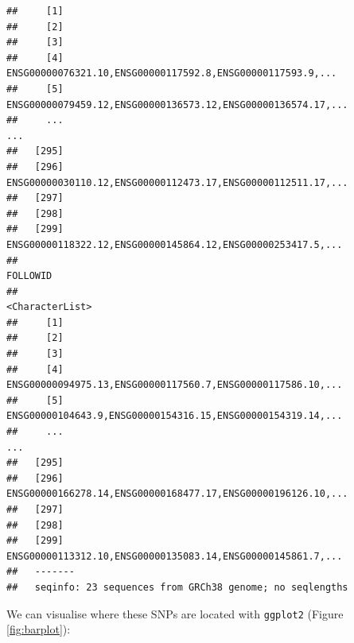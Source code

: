 \documentclass[9pt,a4paper,]{extarticle}
\newenvironment{Shaded}{\begin{snugshade}}{\end{snugshade}}
\newcommand{\KeywordTok}[1]{\textcolor[rgb]{0.13,0.29,0.53}{\textbf{#1}}}
\newcommand{\DataTypeTok}[1]{\textcolor[rgb]{0.13,0.29,0.53}{#1}}
\newcommand{\StringTok}[1]{\textcolor[rgb]{0.31,0.60,0.02}{#1}}
\newcommand{\OperatorTok}[1]{\textcolor[rgb]{0.81,0.36,0.00}{\textbf{#1}}}
\newcommand{\NormalTok}[1]{#1}
\begin{document}
\begin{verbatim}
##     [1]                                                             
##     [2]                                                             
##     [3]                                                             
##     [4]   ENSG00000076321.10,ENSG00000117592.8,ENSG00000117593.9,...
##     [5] ENSG00000079459.12,ENSG00000136573.12,ENSG00000136574.17,...
##     ...                                                          ...
##   [295]                                                             
##   [296] ENSG00000030110.12,ENSG00000112473.17,ENSG00000112511.17,...
##   [297]                                                             
##   [298]                                                             
##   [299]  ENSG00000118322.12,ENSG00000145864.12,ENSG00000253417.5,...
##                                                             FOLLOWID
##                                                      <CharacterList>
##     [1]                                                             
##     [2]                                                             
##     [3]                                                             
##     [4]  ENSG00000094975.13,ENSG00000117560.7,ENSG00000117586.10,...
##     [5]  ENSG00000104643.9,ENSG00000154316.15,ENSG00000154319.14,...
##     ...                                                          ...
##   [295]                                                             
##   [296] ENSG00000166278.14,ENSG00000168477.17,ENSG00000196126.10,...
##   [297]                                                             
##   [298]                                                             
##   [299]  ENSG00000113312.10,ENSG00000135083.14,ENSG00000145861.7,...
##   -------
##   seqinfo: 23 sequences from GRCh38 genome; no seqlengths
\end{verbatim}

We can visualise where these SNPs are located with \texttt{ggplot2} \citep{Wickham2009} (Figure \ref{fig:barplot}):

\begin{Shaded}
\end{Shaded}
\end{document}
